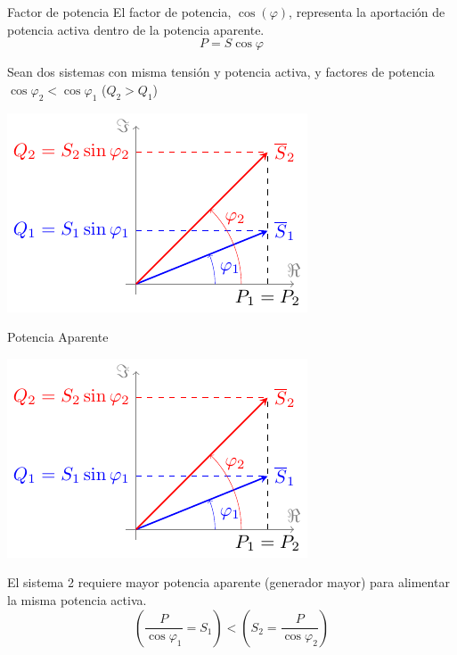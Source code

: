 \documentclass[aspectratio=169, usenames,svgnames,dvipsnames]{beamer}
\begin{document}
\begin{frame}[label={sec:org154e7a0}]{Factor de potencia}
El factor de potencia, \(\cos(\varphi)\), representa la aportación de potencia activa dentro de la potencia aparente.
\[
P = S \cos \varphi
\]

Sean dos sistemas con \alert{misma tensión y potencia activa}, y factores de potencia \(\cos \varphi_2 < \cos \varphi_1\) (\(Q_2 > Q_1\))

\begin{center}
\includegraphics[height=0.5\textheight]{../figs/Fasores_CompensacionReactiva.pdf}
\end{center}
\end{frame}

\begin{frame}[label={sec:org2297188}]{Potencia Aparente}
\begin{center}
\includegraphics[height=0.5\textheight]{../figs/Fasores_CompensacionReactiva.pdf}
\end{center}


El sistema 2 requiere \alert{mayor potencia aparente} (generador mayor) para alimentar la misma potencia activa.
\[
  \left(\dfrac{P}{\cos \varphi_1} = S_1 \right) < \left( S_2 = \dfrac{P}{\cos \varphi_2}\right) 
\]
\end{frame}
\end{document}
